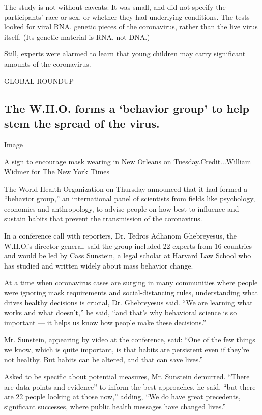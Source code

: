 The study is not without caveats: It was small, and did not specify the
participants' race or sex, or whether they had underlying conditions.
The tests looked for viral RNA, genetic pieces of the coronavirus,
rather than the live virus itself. (Its genetic material is RNA, not
DNA.)

Still, experts were alarmed to learn that young children may carry
significant amounts of the coronavirus.

GLOBAL ROUNDUP

\hypertarget{the-who-forms-a-behavior-group-to-help-stem-the-spread-of-the-virus}{%
\subsection{The W.H.O. forms a `behavior group' to help stem the spread
of the
virus.}\label{the-who-forms-a-behavior-group-to-help-stem-the-spread-of-the-virus}}

Image

A sign to encourage mask wearing in New Orleans on
Tuesday.Credit...William Widmer for The New York Times

The World Health Organization on Thursday announced that it had formed a
``behavior group,'' an international panel of scientists from fields
like psychology, economics and anthropology, to advise people on how
best to influence and sustain habits that prevent the transmission of
the coronavirus.

In a conference call with reporters, Dr. Tedros Adhanom Ghebreyesus, the
W.H.O.'s director general, said the group included 22 experts from 16
countries and would be led by Cass Sunstein, a legal scholar at Harvard
Law School who has studied and written widely about mass behavior
change.

At a time when coronavirus cases are surging in many communities where
people were ignoring mask requirements and social-distancing rules,
understanding what drives healthy decisions is crucial, Dr. Ghebreyesus
said. ``We are learning what works and what doesn't,'' he said, ``and
that's why behavioral science is so important --- it helps us know how
people make these decisions.''

Mr. Sunstein, appearing by video at the conference, said: ``One of the
few things we know, which is quite important, is that habits are
persistent even if they're not healthy. But habits can be altered, and
that can save lives.''

Asked to be specific about potential measures, Mr. Sunstein demurred.
``There are data points and evidence'' to inform the best approaches, he
said, ``but there are 22 people looking at those now,'' adding, ``We do
have great precedents, significant successes, where public health
messages have changed lives.''

